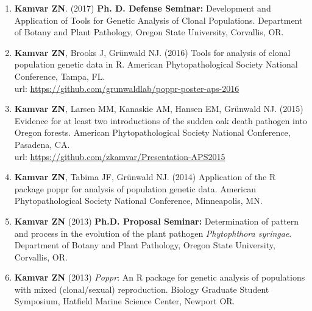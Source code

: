\begin{enumerate}[leftmargin = 14pt]
	\vspace{3pt}

	\item \textbf{Kamvar ZN}. (2017) \textbf{Ph. D. Defense Seminar:} Development and
	Application of Tools for Genetic Analysis of Clonal Populations. Department
	of Botany and Plant Pathology, Oregon State University, Corvallis, OR.

	\vspace{3pt}

	\item \textbf{Kamvar ZN}, Brooks J, Gr\"unwald NJ. (2016) Tools for analysis
	of clonal population genetic data in R. American Phytopathological Society
	National Conference, Tampa, FL.\\
	url: \href{https://github.com/grunwaldlab/poppr-poster-aps-2016#readme}{https://github.com/grunwaldlab/poppr-poster-aps-2016}

	\vspace{3pt}

	\item \textbf{Kamvar ZN}, Larsen MM, Kanaskie AM, Hansen EM, Gr\"unwald NJ.
	(2015) Evidence for at least two introductions of the sudden oak death
	pathogen into Oregon forests. American Phytopathological Society National
	Conference, Pasadena, CA. \\
	url: \href{https://github.com/zkamvar/Presentation-APS2015#readme}{https://github.com/zkamvar/Presentation-APS2015}

	\vspace{3pt}

	\item \textbf{Kamvar ZN}, Tabima JF, Gr\"unwald NJ. (2014) Application of
	the R package poppr for analysis of population genetic data. American
	Phytopathological Society National Conference, Minneapolis, MN.

	\vspace{3pt}

	\item \textbf{Kamvar ZN} (2013) \textbf{Ph.D. Proposal Seminar:} Determination of
	pattern and process in the evolution of the plant pathogen
	\textit{Phytophthora syringae}. Department of Botany and Plant Pathology,
	Oregon State University, Corvallis, OR.

	\vspace{3pt}

	\item \textbf{Kamvar ZN} (2013) \textit{Poppr}: An R package for genetic
	analysis of populations with mixed (clonal/sexual) reproduction. Biology
	Graduate Student Symposium, Hatfield Marine Science Center, Newport OR.


\end{enumerate}
